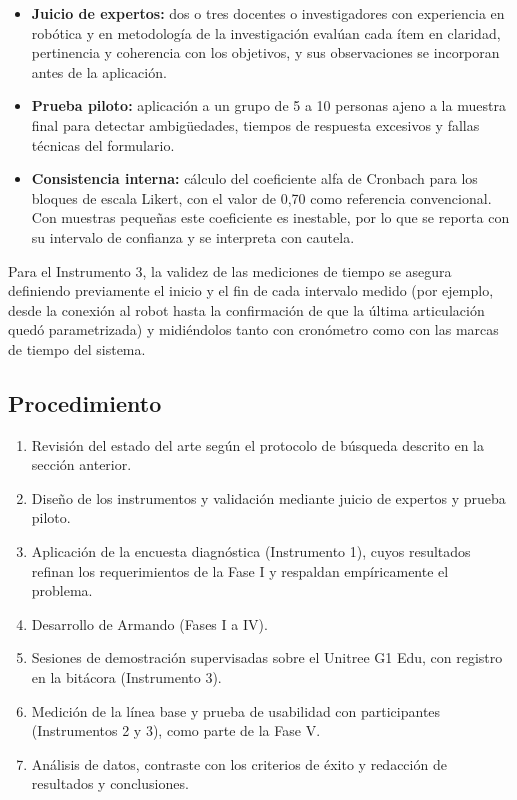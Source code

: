 \documentclass[stu,12pt,floatsintext]{apa7}
\begin{document}
\begin{itemize}
    \item \textbf{Juicio de expertos:} dos o tres docentes o investigadores con experiencia en robótica y en metodología de la investigación evalúan cada ítem en claridad, pertinencia y coherencia con los objetivos, y sus observaciones se incorporan antes de la aplicación.
    \item \textbf{Prueba piloto:} aplicación a un grupo de 5 a 10 personas ajeno a la muestra final para detectar ambigüedades, tiempos de respuesta excesivos y fallas técnicas del formulario.
    \item \textbf{Consistencia interna:} cálculo del coeficiente alfa de Cronbach \parencite{cronbach1951coefficient} para los bloques de escala Likert, con el valor de 0,70 como referencia convencional. Con muestras pequeñas este coeficiente es inestable, por lo que se reporta con su intervalo de confianza y se interpreta con cautela.
\end{itemize}

Para el Instrumento 3, la validez de las mediciones de tiempo se asegura definiendo previamente el inicio y el fin de cada intervalo medido (por ejemplo, desde la conexión al robot hasta la confirmación de que la última articulación quedó parametrizada) y midiéndolos tanto con cronómetro como con las marcas de tiempo del sistema.

\subsection{Procedimiento}

\begin{enumerate}
    \item Revisión del estado del arte según el protocolo de búsqueda descrito en la sección anterior.
    \item Diseño de los instrumentos y validación mediante juicio de expertos y prueba piloto.
    \item Aplicación de la encuesta diagnóstica (Instrumento 1), cuyos resultados refinan los requerimientos de la Fase I y respaldan empíricamente el problema.
    \item Desarrollo de Armando (Fases I a IV).
    \item Sesiones de demostración supervisadas sobre el Unitree G1 Edu, con registro en la bitácora (Instrumento 3).
    \item Medición de la línea base y prueba de usabilidad con participantes (Instrumentos 2 y 3), como parte de la Fase V.
    \item Análisis de datos, contraste con los criterios de éxito y redacción de resultados y conclusiones.
\end{enumerate}
\end{document}
